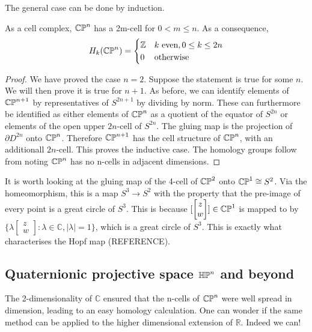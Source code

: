 The general case can be done by induction.

\begin{prop}
As a cell complex, $\mathbb{CP}^{n}$ has a 2m-cell for $0<m\leq n$. As a consequence,
$$H_k(\mathbb{CP}^{n})=\begin{cases} 
      \mathbb{Z} & k \text{ even}, 0\leq k \leq 2n \\
      0 & \text{otherwise}
   \end{cases}
$$
\end{prop}
\begin{proof}
We have proved the case $n=2$. Suppose the statement is true for some $n$. We will then prove it is true for $n+1$. As before, we can identify elements of $\mathbb{CP}^{n+1}$ by representatives of $S^{2n+1}$ by dividing by norm. These can furthermore be identified as either elements of $\mathbb{CP}^{n}$ as a quotient of the equator of $S^{2n}$ or elements of the open upper $2n$-cell of $S^{2n}$. The gluing map is the projection of $\partial D^{2n}$ onto $\mathbb{CP}^{n}$. Therefore $\mathbb{CP}^{n+1}$ has the cell structure of $\mathbb{CP}^{n}$, with an additionall $2n$-cell. This proves the inductive case. The homology groups follow from noting $\mathbb{CP}^{n}$ has no n-cells in adjacent dimensions.
\end{proof}

\begin{remark}\label{hopf}
It is worth looking at the gluing map of the 4-cell of $\mathbb{CP}^{2}$ onto $\mathbb{CP}^{1}\cong S^{2}$. Via the homeomorphism, this is a map $S^{3}\rightarrow S^{2}$ with the property that the pre-image of every point is a great circle of $S^3$. This is because $[\begin{bmatrix}z\\w \end{bmatrix}]\in \mathbb{CP}^{1}$ is mapped to by $\{\lambda \begin{bmatrix}z\\w \end{bmatrix} : \lambda\in \mathbb{C},|\lambda|=1\}$, which is a great circle of $S^{3}$. This is exactly what characterises the Hopf map (REFERENCE).
\end{remark}

\subsection{Quaternionic projective space $\mathbb{HP}^{n}$ and beyond}
The 2-dimensionality of $\mathbb{C}$ ensured that the n-cells of $\mathbb{CP}^{n}$ were well spread in dimension, leading to an easy homology calculation. One can wonder if the same method can be applied to the higher dimensional extension of $\mathbb{R}$. Indeed we can!

